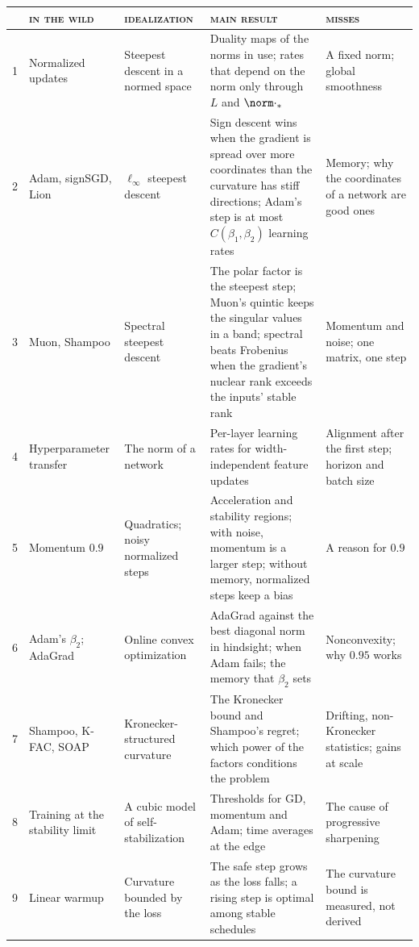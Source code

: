 \begin{refsection}
\begin{table}[p]
\begin{fullwidth}
\centering\footnotesize
\renewcommand{\arraystretch}{1.14}
\begin{tabular}{@{}r>{\raggedright\arraybackslash}p{28mm}>{\raggedright\arraybackslash}p{32mm}>{\raggedright\arraybackslash}p{50mm}>{\raggedright\arraybackslash}p{38mm}@{}}
\toprule
& \textsc{in the wild} & \textsc{idealization} & \textsc{main result} & \textsc{misses}\\
\midrule
1 & Normalized updates & Steepest descent in a normed space & Duality maps of the norms in use; rates that depend on the norm only through $L$ and $\norm\cdot_*$ & A fixed norm; global smoothness\\
2 & Adam, signSGD, Lion & $\ell_\infty$ steepest descent & Sign descent wins when the gradient is spread over more coordinates than the curvature has stiff directions; Adam's step is at most $C(\beta_1,\beta_2)$ learning rates & Memory; why the coordinates of a network are good ones\\
3 & Muon, Shampoo & Spectral steepest descent & The polar factor is the steepest step; Muon's quintic keeps the singular values in a band; spectral beats Frobenius when the gradient's nuclear rank exceeds the inputs' stable rank & Momentum and noise; one matrix, one step\\
4 & Hyperparameter transfer & The norm of a network & Per-layer learning rates for width-independent feature updates & Alignment after the first step; horizon and batch size\\
\midrule
5 & Momentum $0.9$ & Quadratics; noisy normalized steps & Acceleration and stability regions; with noise, momentum is a larger step; without memory, normalized steps keep a bias & A reason for $0.9$\\
6 & Adam's $\beta_2$; AdaGrad & Online convex optimization & AdaGrad against the best diagonal norm in hindsight; when Adam fails; the memory that $\beta_2$ sets & Nonconvexity; why $0.95$ works\\
7 & Shampoo, K-FAC, SOAP & Kronecker-structured curvature & The Kronecker bound and Shampoo's regret; which power of the factors conditions the problem & Drifting, non-Kronecker statistics; gains at scale\\
\midrule
8 & Training at the stability limit & A cubic model of self-stabilization & Thresholds for GD, momentum and Adam; time averages at the edge & The cause of progressive sharpening\\
9 & Linear warmup & Curvature bounded by the loss & The safe step grows as the loss falls; a rising step is optimal among stable schedules & The curvature bound is measured, not derived\\

\end{tabular}
\end{fullwidth}
\end{table}
\end{refsection}
